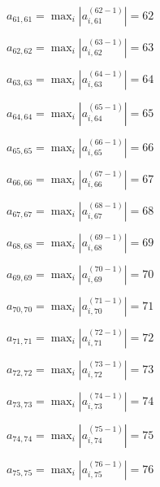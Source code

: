\documentclass[a4paper,12pt]{article}
\begin{document}
$a _{ 61, 61 } =  \max _i |a _{ i, 61 } ^{ (62 - 1) } | = 62$

$a _{ 62, 62 } =  \max _i |a _{ i, 62 } ^{ (63 - 1) } | = 63$

$a _{ 63, 63 } =  \max _i |a _{ i, 63 } ^{ (64 - 1) } | = 64$

$a _{ 64, 64 } =  \max _i |a _{ i, 64 } ^{ (65 - 1) } | = 65$

$a _{ 65, 65 } =  \max _i |a _{ i, 65 } ^{ (66 - 1) } | = 66$

$a _{ 66, 66 } =  \max _i |a _{ i, 66 } ^{ (67 - 1) } | = 67$

$a _{ 67, 67 } =  \max _i |a _{ i, 67 } ^{ (68 - 1) } | = 68$

$a _{ 68, 68 } =  \max _i |a _{ i, 68 } ^{ (69 - 1) } | = 69$

$a _{ 69, 69 } =  \max _i |a _{ i, 69 } ^{ (70 - 1) } | = 70$

$a _{ 70, 70 } =  \max _i |a _{ i, 70 } ^{ (71 - 1) } | = 71$

$a _{ 71, 71 } =  \max _i |a _{ i, 71 } ^{ (72 - 1) } | = 72$

$a _{ 72, 72 } =  \max _i |a _{ i, 72 } ^{ (73 - 1) } | = 73$

$a _{ 73, 73 } =  \max _i |a _{ i, 73 } ^{ (74 - 1) } | = 74$

$a _{ 74, 74 } =  \max _i |a _{ i, 74 } ^{ (75 - 1) } | = 75$

$a _{ 75, 75 } =  \max _i |a _{ i, 75 } ^{ (76 - 1) } | = 76$
\end{document}

